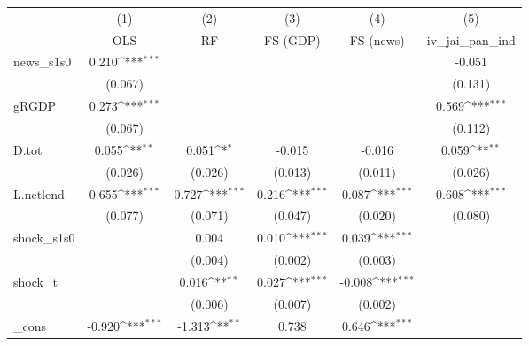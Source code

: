 {
\def\sym#1{\ifmmode^{#1}\else\(^{#1}\)\fi}
\begin{tabular}{l*{5}{c}}
\toprule
            &\multicolumn{1}{c}{(1)}&\multicolumn{1}{c}{(2)}&\multicolumn{1}{c}{(3)}&\multicolumn{1}{c}{(4)}&\multicolumn{1}{c}{(5)}\\
            &\multicolumn{1}{c}{OLS}&\multicolumn{1}{c}{RF}&\multicolumn{1}{c}{FS (GDP)}&\multicolumn{1}{c}{FS (news)}&\multicolumn{1}{c}{iv\_jai\_pan\_ind}\\
\midrule
news\_s1s0   &       0.210\sym{***}&                     &                     &                     &      -0.051         \\
            &     (0.067)         &                     &                     &                     &     (0.131)         \\
\addlinespace
gRGDP       &       0.273\sym{***}&                     &                     &                     &       0.569\sym{***}\\
            &     (0.067)         &                     &                     &                     &     (0.112)         \\
\addlinespace
D.tot       &       0.055\sym{**} &       0.051\sym{*}  &      -0.015         &      -0.016         &       0.059\sym{**} \\
            &     (0.026)         &     (0.026)         &     (0.013)         &     (0.011)         &     (0.026)         \\
\addlinespace
L.netlend   &       0.655\sym{***}&       0.727\sym{***}&       0.216\sym{***}&       0.087\sym{***}&       0.608\sym{***}\\
            &     (0.077)         &     (0.071)         &     (0.047)         &     (0.020)         &     (0.080)         \\
\addlinespace
shock\_s1s0  &                     &       0.004         &       0.010\sym{***}&       0.039\sym{***}&                     \\
            &                     &     (0.004)         &     (0.002)         &     (0.003)         &                     \\
\addlinespace
shock\_t     &                     &       0.016\sym{**} &       0.027\sym{***}&      -0.008\sym{***}&                     \\
            &                     &     (0.006)         &     (0.007)         &     (0.002)         &                     \\
\addlinespace
\_cons      &      -0.920\sym{***}&      -1.313\sym{**} &       0.738         &       0.646\sym{***}&                     \\

\end{tabular}}
